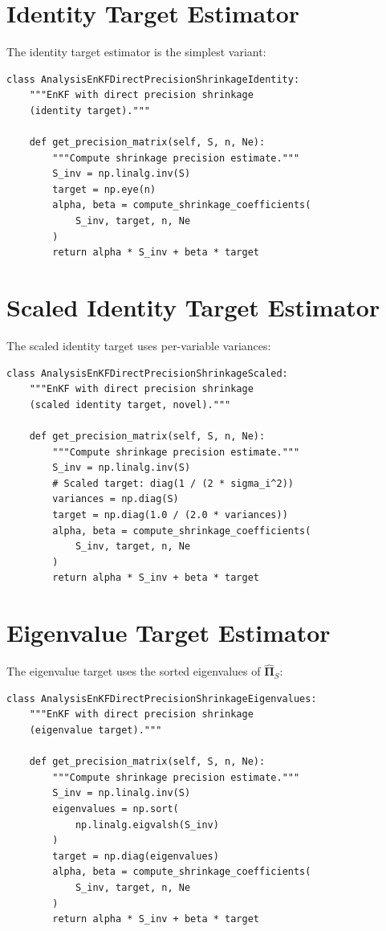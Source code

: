 \section{Identity Target Estimator}

The identity target estimator is the simplest variant:

\begin{verbatim}
class AnalysisEnKFDirectPrecisionShrinkageIdentity:
    """EnKF with direct precision shrinkage
    (identity target)."""

    def get_precision_matrix(self, S, n, Ne):
        """Compute shrinkage precision estimate."""
        S_inv = np.linalg.inv(S)
        target = np.eye(n)
        alpha, beta = compute_shrinkage_coefficients(
            S_inv, target, n, Ne
        )
        return alpha * S_inv + beta * target
\end{verbatim}

\section{Scaled Identity Target Estimator}

The scaled identity target uses per-variable variances:

\begin{verbatim}
class AnalysisEnKFDirectPrecisionShrinkageScaled:
    """EnKF with direct precision shrinkage
    (scaled identity target, novel)."""

    def get_precision_matrix(self, S, n, Ne):
        """Compute shrinkage precision estimate."""
        S_inv = np.linalg.inv(S)
        # Scaled target: diag(1 / (2 * sigma_i^2))
        variances = np.diag(S)
        target = np.diag(1.0 / (2.0 * variances))
        alpha, beta = compute_shrinkage_coefficients(
            S_inv, target, n, Ne
        )
        return alpha * S_inv + beta * target
\end{verbatim}

\section{Eigenvalue Target Estimator}

The eigenvalue target uses the sorted eigenvalues of $\hat{\boldsymbol{\Pi}}_S$:

\begin{verbatim}
class AnalysisEnKFDirectPrecisionShrinkageEigenvalues:
    """EnKF with direct precision shrinkage
    (eigenvalue target)."""

    def get_precision_matrix(self, S, n, Ne):
        """Compute shrinkage precision estimate."""
        S_inv = np.linalg.inv(S)
        eigenvalues = np.sort(
            np.linalg.eigvalsh(S_inv)
        )
        target = np.diag(eigenvalues)
        alpha, beta = compute_shrinkage_coefficients(
            S_inv, target, n, Ne
        )
        return alpha * S_inv + beta * target
\end{verbatim}

